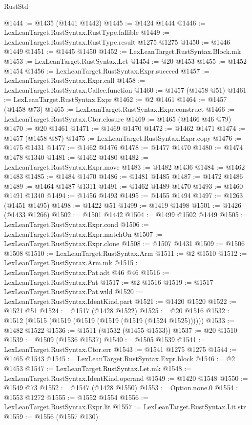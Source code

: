 \begin{lexlean}{RustStd}
\begin{coremodule}
@1444 := @1435 (@1441 @1442)
@1445 := @1424 @1444
@1446 := LexLeanTarget.RustSyntax.RustType.fallible
@1449 := LexLeanTarget.RustSyntax.RustType.result @1275 @1275
@1450 := @1446 @1449
@1451 := @1445 @1450
@1452 := LexLeanTarget.RustSyntax.Block.mk
@1453 := LexLeanTarget.RustSyntax.Let
@1454 := @20 @1453
@1455 := @1452 @1454
@1456 := LexLeanTarget.RustSyntax.Expr.succeed
@1457 := LexLeanTarget.RustSyntax.Expr.call
@1458 := LexLeanTarget.RustSyntax.Callee.function
@1460 := @1457 (@1458 @51)
@1461 := LexLeanTarget.RustSyntax.Expr
@1462 := @2 @1461
@1464 := @1457 (@1458 @73)
@1465 := LexLeanTarget.RustSyntax.Expr.construct
@1466 := LexLeanTarget.RustSyntax.Ctor.closure
@1469 := @1465 (@1466 @46 @79)
@1470 := @20 @1461
@1471 := @1469 @1470
@1472 := @1462 @1471
@1474 := @1457 (@1458 @87)
@1475 := LexLeanTarget.RustSyntax.Expr.copy
@1476 := @1475 @1431
@1477 := @1462 @1476
@1478 := @1477 @1470
@1480 := @1474 @1478 @1340
@1481 := @1462 @1480
@1482 := LexLeanTarget.RustSyntax.Expr.move
@1483 := @1482 @1436
@1484 := @1462 @1483
@1485 := @1484 @1470
@1486 := @1481 @1485
@1487 := @1472 @1486
@1489 := @1464 @1487 @1311
@1491 := @1462 @1489 @1470
@1493 := @1460 @1491 @1340
@1494 := @1456 @1493
@1495 := @1455 @1494
@1497 := @1263 (@1451 @1495)
@1498 := @1422 @51
@1499 := @1419 @1498
@1501 := @1426 (@1433 @1266)
@1502 := @1501 @1442
@1504 := @1499 @1502 @1449
@1505 := LexLeanTarget.RustSyntax.Expr.cond
@1506 := LexLeanTarget.RustSyntax.Expr.matchOn
@1507 := LexLeanTarget.RustSyntax.Expr.clone
@1508 := @1507 @1431
@1509 := @1506 @1508
@1510 := LexLeanTarget.RustSyntax.Arm
@1511 := @2 @1510
@1512 := LexLeanTarget.RustSyntax.Arm.mk
@1515 := LexLeanTarget.RustSyntax.Pat.adt @46 @46
@1516 := LexLeanTarget.RustSyntax.Pat
@1517 := @2 @1516
@1519 := @1517 LexLeanTarget.RustSyntax.Pat.wild
@1520 := LexLeanTarget.RustSyntax.IdentKind.part
@1521 := @1420 @1520
@1522 := @1521 @51
@1524 := @1517 (@1428 @1522)
@1525 := @20 @1516
@1532 := @1512 (@1515 (@1519 (@1519 (@1519 (@1519 (@1524 @1525))))))
@1533 := @1482 @1522
@1536 := @1511 (@1532 (@1455 @1533))
@1537 := @20 @1510
@1539 := @1509 (@1536 @1537)
@1540 := @1505 @1539
@1541 := LexLeanTarget.RustSyntax.Ctor.err
@1543 := @1541 @1275 @1275
@1544 := @1465 @1543
@1545 := LexLeanTarget.RustSyntax.Expr.block
@1546 := @2 @1453
@1547 := LexLeanTarget.RustSyntax.Let.mk
@1548 := LexLeanTarget.RustSyntax.IdentKind.operand
@1549 := @1420 @1548
@1550 := @1549 @73
@1552 := @1547 (@1428 @1550)
@1553 := Option.none.{0}
@1554 := @1553 @1272
@1555 := @1552 @1554
@1556 := LexLeanTarget.RustSyntax.Expr.lit
@1557 := LexLeanTarget.RustSyntax.Lit.str
@1559 := @1556 (@1557 @130)

\end{coremodule}
\end{lexlean}
